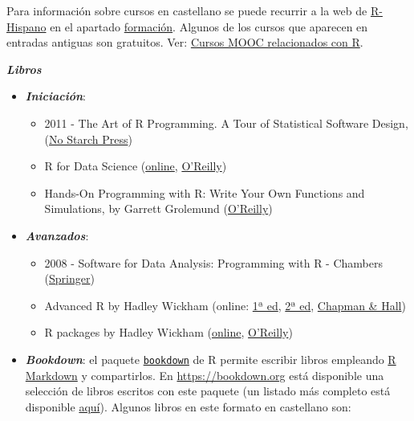 \documentclass[
]{book}
\theoremstyle{break}
\begin{document}
Para información sobre cursos en castellano se puede recurrir a la web de \href{http://r-es.org/}{R-Hispano} en el apartado \href{http://r-es.org/category/formacion}{formación}. Algunos de los cursos que aparecen en entradas antiguas son gratuitos.
Ver: \href{http://r-es.org/2016/02/12/cursos-masivos-y-otra-formacion-on-line-sobre-r/}{Cursos MOOC relacionados con R}.

\textbf{\emph{Libros}}

\begin{itemize}
\item
  \textbf{\emph{Iniciación}}:

  \begin{itemize}
  \item
    2011 - The Art of R Programming. A Tour of Statistical Software Design,
    (\href{https://www.nostarch.com/artofr.htm}{No Starch Press})
  \item
    R for Data Science
    (\href{http://r4ds.had.co.nz/}{online}, \href{http://shop.oreilly.com/product/0636920034407.do}{O'Reilly})
  \item
    Hands-On Programming with R: Write Your Own Functions and Simulations,
    by Garrett Grolemund
    (\href{http://shop.oreilly.com/product/0636920028574.do}{O'Reilly})
  \end{itemize}
\item
  \textbf{\emph{Avanzados}}:

  \begin{itemize}
  \item
    2008 - Software for Data Analysis: Programming with R - Chambers
    (\href{http://www.springer.com/la/book/9780387759357}{Springer})
  \item
    Advanced R by Hadley Wickham
    (online: \href{http://adv-r.had.co.nz/}{1ª ed},
    \href{https://adv-r.hadley.nz/}{2ª ed},
    \href{https://www.amazon.com/dp/1466586966}{Chapman \& Hall})
  \item
    R packages by Hadley Wickham
    (\href{http://r-pkgs.had.co.nz/}{online},
    \href{http://shop.oreilly.com/product/0636920034421.do}{O'Reilly})
  \end{itemize}
\item
  \textbf{\emph{Bookdown}}:
  el paquete \href{https://bookdown.org}{\texttt{bookdown}} de R permite escribir libros empleando
  \href{http://rmarkdown.rstudio.com}{R Markdown} y compartirlos.
  En \url{https://bookdown.org} está disponible una selección de libros escritos con este paquete
  (un listado más completo está disponible \href{https://bookdown.org/home/archive/}{aquí}).
  Algunos libros en este formato en castellano son:


\end{itemize}
\end{document}

